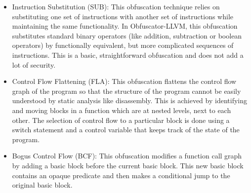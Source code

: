 \begin{itemize}
    \item Instruction Substitution (SUB): This obfuscation technique 
    relies on substituting one set of instructions with another set of 
    instructions while maintaining the same functionality. In 
    Obfuscator-LLVM, this obfuscation substitutes standard binary 
    operators (like addition, subtraction or boolean operators) by 
    functionally equivalent, but more complicated sequences of 
    instructions. This is a basic, straightforward obfuscation and does 
    not add a lot of security. 
    
    \item Control Flow Flattening (FLA): This obfuscation flattens the 
    control flow graph of the program so that the structure of the program 
    cannot be easily understood by static analysis like disassembly. This 
    is achieved by identifying and moving blocks in a function which are 
    at nested levels, next to each other. The selection of control flow to 
    a particular block is done using a switch statement and a control 
    variable that keeps track of the state of the program. 

    \item Bogus Control Flow (BCF): This obfuscation modifies a function 
    call graph by adding a basic block before the current basic block. 
    This new basic block contains an opaque predicate and then makes a 
    conditional jump to the original basic block.
\end{itemize}
